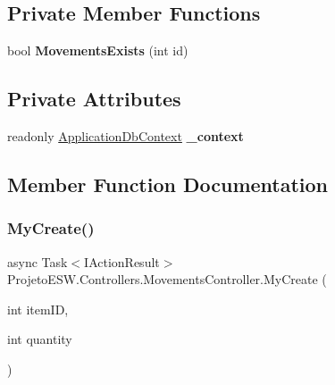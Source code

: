 \subsection*{Private Member Functions}
\begin{DoxyCompactItemize}
\item 
\mbox{\label{class_projeto_e_s_w_1_1_controllers_1_1_movements_controller_a3c0b3f89cdc8df6dbc7a06f088fc7281}} 
bool {\bfseries Movements\+Exists} (int id)
\end{DoxyCompactItemize}
\subsection*{Private Attributes}
\begin{DoxyCompactItemize}
\item 
\mbox{\label{class_projeto_e_s_w_1_1_controllers_1_1_movements_controller_a41d7d299d2a21fea6a56a6f7b89193e3}} 
readonly \mbox{\hyperlink{class_projeto_e_s_w_1_1_data_1_1_application_db_context}{Application\+Db\+Context}} {\bfseries \+\_\+context}
\end{DoxyCompactItemize}


\subsection{Member Function Documentation}
\mbox{\label{class_projeto_e_s_w_1_1_controllers_1_1_movements_controller_aec0f7583a2b49b2827e0c0f3caac18d9}} 
\subsubsection{\texorpdfstring{My\+Create()}{MyCreate()}}
{\footnotesize\ttfamily async Task$<$I\+Action\+Result$>$ Projeto\+E\+S\+W.\+Controllers.\+Movements\+Controller.\+My\+Create (\begin{DoxyParamCaption}\item[{int}]{item\+ID,  }\item[{int}]{quantity }\end{DoxyParamCaption})}



